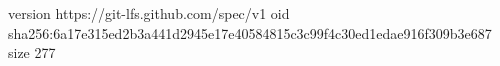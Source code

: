 version https://git-lfs.github.com/spec/v1
oid sha256:6a17e315ed2b3a441d2945e17e40584815c3c99f4c30ed1edae916f309b3e687
size 277
